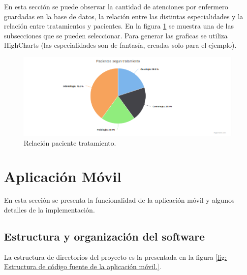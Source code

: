 En esta sección se puede observar la cantidad de atenciones por enfermero guardadas en la base de datos, la relación entre las distintas especialidades y la relación entre tratamientos y pacientes. En la figura \ref{fig:Relación paciente tratamiento.} se muestra una de las subsecciones que se pueden seleccionar. Para generar las graficas se utiliza HighCharts \citep{WEBSITE:33} (las especialidades son de fantasía, creadas solo para el ejemplo). 
\begin{figure}[ht]
	\centering
	\includegraphics[scale=.65]{./Figures/web/pacientes-Tratamiento.png}
	\caption{Relación paciente tratamiento.}
	\label{fig:Relación paciente tratamiento.}
\end{figure} 


\pagebreak
\section{Aplicación Móvil}
\label{Aplicación Móvil}
En esta sección se presenta la funcionalidad de la aplicación móvil y algunos detalles de la implementación.
\label{Estructura y organización del software}
\subsection{Estructura y organización del software}
La estructura de directorios del proyecto es la presentada en la figura \ref{fig: Estructura de código fuente de la aplicación móvil.}.

